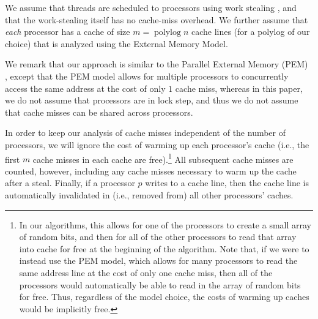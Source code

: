 \documentclass[a4paper,UKenglish,cleveref, autoref, thm-restate]{lipics-v2019}
\DeclareMathOperator{\polylog}{\text{polylog}}
\begin{document}
We assume that threads are scheduled to processors using work stealing
\cite{AcarBl00, BlumofeLe99, FrigoLeRa98, AroraBlPl98, BlumofeJo96},
and that the work-stealing itself has no cache-miss overhead. We
further assume that \emph{each} processor has a cache of size
$m = \polylog n$ cache lines (for a polylog of our choice) that is
analyzed using the External Memory Model.

We remark that our approach is similar to the Parallel External Memory
(PEM) \cite{PEM}, except that the PEM model allows for multiple
processors to concurrently access the same address at the cost of only
$1$ cache miss, whereas in this paper, we do not assume that
processors are in lock step, and thus we do not assume that cache
misses can be shared across processors.

In order to keep our analysis of cache misses independent of the
number of processors, we will ignore the cost of warming up each
processor's cache (i.e., the first $m$ cache misses in each cache are
free).\footnote{In our algorithms, this allows for one of the
  processors to create a small array of random bits, and then for all
  of the other processors to read that array into cache for free at
  the beginning of the algorithm. Note that, if we were to instead use
  the PEM model, which allows for many processors to read the same
  address line at the cost of only one cache miss, then all of the
  processors would automatically be able to read in the array of
  random bits for free. Thus, regardless of the model choice, the
  costs of warming up caches would be implicitly free.} All subsequent
cache misses are counted, however, including any cache misses
necessary to warm up the cache after a steal.  Finally, if a processor
$p$ writes to a cache line, then the cache line is automatically
invalidated in (i.e., removed from) all other processors' caches.

\end{document}
